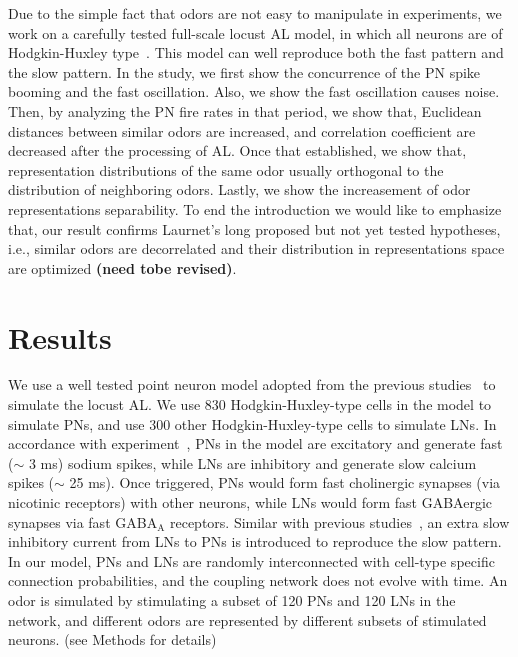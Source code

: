 \documentclass[12pt, a4paper]{article}
\begin{document}
Due to the simple fact that odors are not easy to manipulate in experiments, we work on a carefully tested full-scale locust AL model, in which all neurons are of Hodgkin-Huxley type~\citep{Patel2009, Patel2013}. This model can well reproduce both the fast pattern and the slow pattern. In the study, we first show the concurrence of the PN spike booming and the fast oscillation. Also, we show the fast oscillation causes noise. Then, by analyzing the PN fire rates in that period, we show that, Euclidean distances between similar odors are increased, and correlation coefficient are decreased after the processing of AL. Once that established, we show that, representation distributions of the same odor usually orthogonal to the distribution of neighboring odors. Lastly, we show the increasement of odor representations separability. To end the introduction we would like to emphasize that, our result confirms Laurnet's long proposed but not yet tested hypotheses, i.e., similar odors are decorrelated and their distribution in representations space are optimized {\bf (need tobe revised)}.


\section{Results}


We use a well tested point neuron model adopted from the previous studies~\citep{} to simulate the locust AL. We use 830 Hodgkin-Huxley-type cells in the model to simulate PNs, and use 300 other Hodgkin-Huxley-type cells to simulate LNs. In accordance with experiment~\citep{}, PNs in the model are excitatory and generate fast ($\sim$ 3 ms) sodium spikes, while LNs are inhibitory and generate slow calcium spikes ($\sim$ 25 ms). Once triggered, PNs would form fast cholinergic synapses (via nicotinic receptors) with other neurons, while LNs would form fast GABAergic synapses via fast GABA$_{\mbox{A}}$ receptors. Similar with previous studies~\citep{}, an extra slow inhibitory current from LNs to PNs is introduced to reproduce the slow pattern.
In our model, PNs and LNs are randomly interconnected with cell-type specific connection probabilities, %
and the coupling network does not evolve with time.
An odor is simulated by stimulating a subset of 120 PNs and 120 LNs in the network, and different odors are represented by different subsets of stimulated neurons. (see Methods for details)
\end{document}
